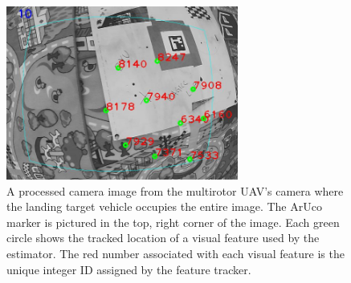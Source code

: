 \begin{figure}
  \centering
  \includegraphics[width=3.0in]{imgs/features_with_aruco.png}
  \caption[Visual Feature Tracking During Flight Experiment]{A processed camera
    image from the multirotor UAV's camera where the landing target vehicle
    occupies the entire image. The ArUco
  marker is pictured in the top, right corner of the image. Each green
circle shows the tracked location of a visual feature used by the
estimator. The red number associated with each visual feature is the unique
integer ID assigned by the feature tracker.}
  \label{fig:features_with_aruco}
\end{figure}
